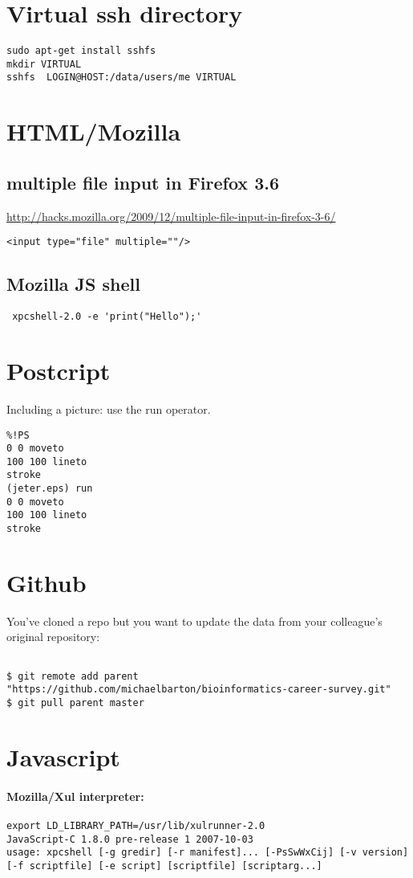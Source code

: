 \documentclass[12pt]{article}
\begin{document}
\section{Virtual ssh directory}
\begin{lstlisting}
sudo apt-get install sshfs
mkdir VIRTUAL
sshfs  LOGIN@HOST:/data/users/me VIRTUAL
\end{lstlisting}

\section{HTML/Mozilla}
\subsection{multiple file input in Firefox 3.6}
\url{http://hacks.mozilla.org/2009/12/multiple-file-input-in-firefox-3-6/}
\begin{lstlisting}
<input type="file" multiple=""/>
\end{lstlisting}
\subsection{Mozilla JS shell}
\begin{lstlisting}
 xpcshell-2.0 -e 'print("Hello");'
\end{lstlisting}
\section{Postcript}
Including a picture: use the run operator.
\begin{lstlisting}
%!PS
0 0 moveto
100 100 lineto
stroke
(jeter.eps) run
0 0 moveto
100 100 lineto
stroke
\end{lstlisting}
\section{Github}
You've cloned a repo but you want to update the data from your colleague's original repository:
\begin{lstlisting}

$ git remote add parent "https://github.com/michaelbarton/bioinformatics-career-survey.git"
$ git pull parent master
\end{lstlisting}
\section{Javascript}
\paragraph{Mozilla/Xul interpreter:}
\begin{lstlisting}
export LD_LIBRARY_PATH=/usr/lib/xulrunner-2.0
JavaScript-C 1.8.0 pre-release 1 2007-10-03
usage: xpcshell [-g gredir] [-r manifest]... [-PsSwWxCij] [-v version] [-f scriptfile] [-e script] [scriptfile] [scriptarg...]
\end{lstlisting}
\end{document}
